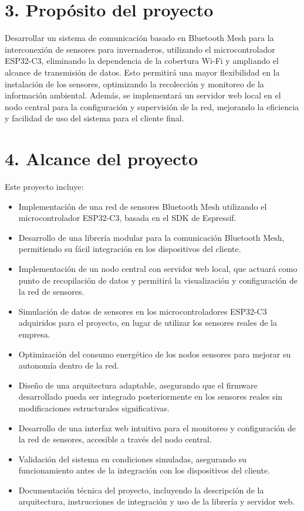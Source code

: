 \documentclass[
11pt, %
]{charter}
\begin{document}
{\section{3. Propósito del proyecto}
\label{sec:proposito}

Desarrollar un sistema de comunicación basado en Bluetooth Mesh para la interconexión de sensores para invernaderos, utilizando el microcontrolador ESP32-C3, eliminando la dependencia de la cobertura Wi-Fi y ampliando el alcance de transmisión de datos. Esto permitirá una mayor flexibilidad en la instalación de los sensores, optimizando la recolección y monitoreo de la información ambiental. Además, se implementará un servidor web local en el nodo central para la configuración y supervisión de la red, mejorando la eficiencia y facilidad de uso del sistema para el cliente final.

\section{4. Alcance del proyecto}
\label{sec:alcance}

Este proyecto incluye: 

\begin{itemize}
\item Implementación de una red de sensores Bluetooth Mesh utilizando el microcontrolador ESP32-C3, basada en el SDK de Espressif.
\item Desarrollo de una librería modular para la comunicación Bluetooth Mesh, permitiendo su fácil integración en los dispositivos del cliente.
\item Implementación de un nodo central con servidor web local, que actuará como punto de recopilación de datos y permitirá la visualización y configuración de la red de sensores.
\item Simulación de datos de sensores en los microcontroladores ESP32-C3 adquiridos para el proyecto, en lugar de utilizar los sensores reales de la empresa.
\item Optimización del consumo energético de los nodos sensores para mejorar su autonomía dentro de la red.
\item Diseño de una arquitectura adaptable, asegurando que el firmware desarrollado pueda ser integrado posteriormente en los sensores reales sin modificaciones estructurales significativas.
\item Desarrollo de una interfaz web intuitiva para el monitoreo y configuración de la red de sensores, accesible a través del nodo central.
\item Validación del sistema en condiciones simuladas, asegurando su funcionamiento antes de la integración con los dispositivos del cliente.
\item Documentación técnica del proyecto, incluyendo la descripción de la arquitectura, instrucciones de integración y uso de la librería y servidor web.


\end{itemize}}
\end{document}
